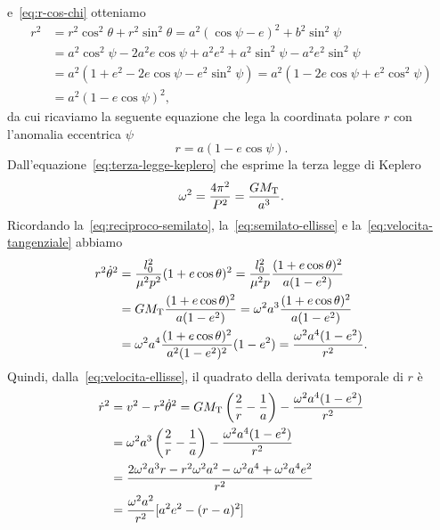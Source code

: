 e~\eqref{eq:r-cos-chi} otteniamo
\begin{equation}
  \begin{split}
    r^2 &= r^2\cos^2\theta + r^2\sin^2\theta = a^2(\cos\psi - e)^2 +
    b^2\sin^2\psi\\
    &= a^2\cos^2\psi-2a^2e\cos\psi+a^2e^2+a^2\sin^2\psi-a^2e^2\sin^2\psi\\
    &= a^2(1+e^2-2e\cos\psi-e^2\sin^2\psi) = a^2(1-2e\cos\psi+e^2\cos^2\psi)\\
    &= a^2(1 - e\cos\psi)^2,
  \end{split}
\end{equation}
da cui ricaviamo la seguente equazione che lega la coordinata polare $r$ con
l'anomalia eccentrica $\psi$
\begin{equation}
  \label{eq:r-anomalia-eccentrica}
  r = a(1 - e\cos\psi).
\end{equation}
Dall'equazione~\eqref{eq:terza-legge-keplero} che esprime la terza legge di
Keplero
\begin{equation}
  \omega^2 = \frac{4\pi^2}{P^2} = \frac{GM_\textup{T}}{a^3}.
\end{equation}
Ricordando la~\eqref{eq:reciproco-semilato}, la~\eqref{eq:semilato-ellisse} e
la~\eqref{eq:velocita-tangenziale} abbiamo
\begin{equation}
  \begin{split}
    r^2\dot{\theta}^2 &= \frac{l_0^2}{\mu^2p^2}(1 + e\cos\theta)^2 =
    \frac{l_0^2}{\mu^2p} \frac{(1+e\cos\theta)^2}{a(1-e^2)} \\
    &= GM_\textup{T} \frac{(1+e\cos\theta)^2}{a(1-e^2)} = \omega^2a^3
    \frac{(1+e\cos\theta)^2}{a(1-e^2)} \\
    &= \omega^2a^4 \frac{(1+e\cos\theta)^2}{a^2(1-e^2)^2}(1-e^2) =
    \frac{\omega^2a^4(1-e^2)}{r^2}.
  \end{split}
\end{equation}
Quindi, dalla~\eqref{eq:velocita-ellisse}, il quadrato della derivata temporale
di $r$ è
\begin{equation}
  \begin{split}
    \dot{r}^2 &= v^2 - r^2\dot{\theta}^2 = GM_\textup{T}
    \left(
      \frac{2}{r} - \frac{1}{a}
    \right) - \frac{\omega^2a^4(1-e^2)}{r^2} \\
        &= \omega^2a^3
    \left(
      \frac{2}{r} - \frac{1}{a}
    \right) - \frac{\omega^2a^4(1-e^2)}{r^2} \\
    &= \frac{2\omega^2a^3r-r^2\omega^2a^2-\omega^2a^4+\omega^2a^4e^2}{r^2}\\
    &= \frac{\omega^2a^2}{r^2}[a^2e^2-(r-a)^2]
  \end{split}
\end{equation}
